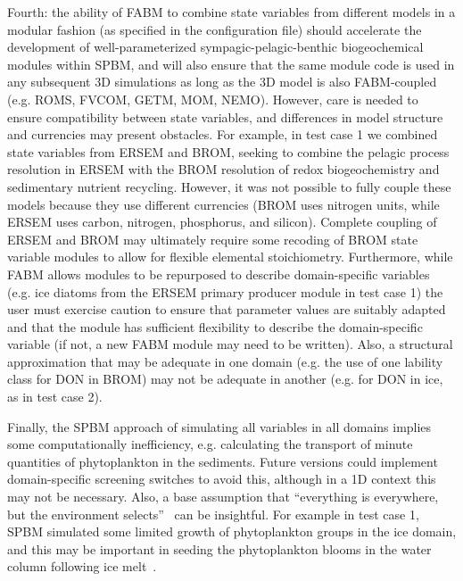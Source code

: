 \documentclass[gmd, manuscript]{copernicus}
\begin{document}
Fourth: the ability of \textrm{FABM} to combine state variables from different models in a modular fashion (as specified in the configuration file) should accelerate the development of well-parameterized sympagic-pelagic-benthic biogeochemical modules within \textrm{SPBM}, and will also ensure that the same module code is used in any subsequent 3D simulations as long as the 3D model is also \textrm{FABM}-coupled (e.g. \textrm{ROMS}, \textrm{FVCOM}, \textrm{GETM}, \textrm{MOM}, \textrm{NEMO}).
However, care is needed to ensure compatibility between state variables, and differences in model structure and currencies may present obstacles.
For example, in test case 1 we combined state variables from \textrm{ERSEM} and \textrm{BROM}, seeking to combine the pelagic process resolution in \textrm{ERSEM} with the \textrm{BROM} resolution of redox biogeochemistry and sedimentary nutrient recycling.
However, it was not possible to fully couple these models because they use different currencies (\textrm{BROM} uses nitrogen units, while \textrm{ERSEM} uses carbon, nitrogen, phosphorus, and silicon).
Complete coupling of \textrm{ERSEM} and \textrm{BROM} may ultimately require some recoding of \textrm{BROM} state variable modules to allow for flexible elemental stoichiometry.
Furthermore, while \textrm{FABM} allows modules to be repurposed to describe domain-specific variables (e.g. ice diatoms from the \textrm{ERSEM} primary producer module in test case 1) the user must exercise caution to ensure that parameter values are suitably adapted and that the module has sufficient flexibility to describe the domain-specific variable (if not, a new \textrm{FABM} module may need to be written).
Also, a structural approximation that may be adequate in one domain (e.g. the use of one lability class for \textrm{DON} in \textrm{BROM}) may not be adequate in another (e.g. for \textrm{DON} in ice, as in test case 2).

Finally, the \textrm{SPBM} approach of simulating all variables in all domains implies some computationally inefficiency, e.g. calculating the transport of minute quantities of phytoplankton in the sediments.
Future versions could implement domain-specific screening switches to avoid this, although in a 1D context this may not be necessary.
Also, a base assumption that “everything is everywhere, but the environment selects”~\citep{OMalley2008} can be insightful.
For example in test case 1, \textrm{SPBM} simulated some limited growth of phytoplankton groups in the ice domain, and this may be important in seeding the phytoplankton blooms in the water column following ice melt~\citep{Mundy2011}.
\end{document}

